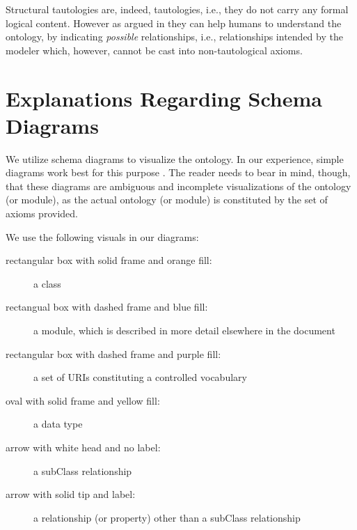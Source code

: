 Structural tautologies are, indeed, tautologies, i.e., they do not carry any formal logical content. However as argued in \cite{HitzlerK16} they can help humans to understand the ontology, by indicating \emph{possible} relationships, i.e., relationships intended by the modeler which, however, cannot be cast into non-tautological axioms.

\section*{Explanations Regarding Schema Diagrams}

We utilize schema diagrams to visualize the ontology. In our experience, simple diagrams work best for this purpose \cite{ShimizuEKHKH19}. The reader needs to bear in mind, though, that these diagrams are ambiguous and incomplete visualizations of the ontology (or module), as the actual ontology (or module) is constituted by the set of axioms provided. 

We use the following visuals in our diagrams:

\begin{description}
\item[rectangular box with solid frame and orange fill:] a class
\item[rectangual box with dashed frame and blue fill:] a module, which is described in more detail elsewhere in the document
\item[rectangular box with dashed frame and purple fill:] a set of URIs constituting a controlled vocabulary
\item[oval with solid frame and yellow fill:] a data type
\item[arrow with white head and no label:] a subClass relationship
\item[arrow with solid tip and label:] a relationship (or property) other than a subClass relationship
\end{description}

